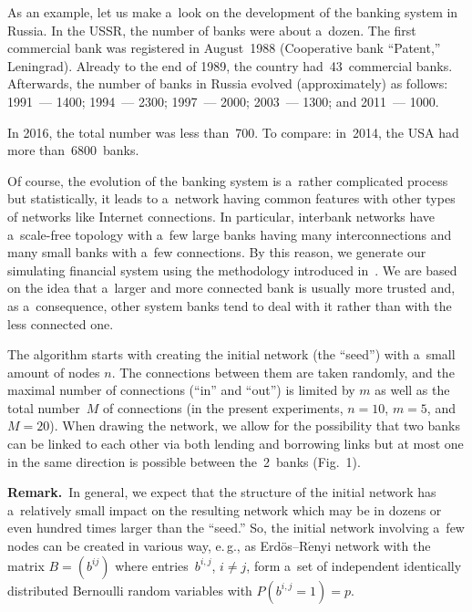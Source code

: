 \begin{multicols}{2}
As an example, let us make a~look on  the development of the banking system in 
Russia. In the USSR, the number of banks were about a~dozen. The first commercial 
bank was registered in August~1988 (Cooperative bank ``Patent,'' Leningrad).  
Already to the end of 1989, the country had~43~commercial banks.   Afterwards,  
the number of banks in Russia evolved (approximately) as follows:  
1991~--- 1400;  1994~--- 2300; 1997~--- 2000; 2003~--- 1300; and  2011~---
1000. 

In   2016, the total number was  less than~700.  To compare:  in~2014, the USA had  
more than~6800~banks.  

Of course, the evolution of the banking system is a~rather complicated process 
but  statistically, it leads to a~network having common features with other 
types of networks like Internet connections.  In particular, interbank networks 
have a~scale-free topology with a~few large banks having many interconnections 
and many small banks with a~few connections.
By this reason, we generate our simulating financial system using the 
methodology introduced in~\cite{BarAlb}. We are 
based on the idea that a~larger and more connected bank is usually more trusted 
and, as a~consequence, other system banks tend to deal with it rather than with 
the less connected  one.

The algorithm starts with creating the initial network (the ``seed'') with 
a~small amount of nodes $n$.  The connections between them are taken randomly, and 
the maximal number of connections (``in'' and ``out'')  is limited by $m$ as well 
as the total number~$M$ of connections (in the present experiments, $n=10$, $m=5$, 
and $M=20$). 
  When drawing the network, we allow for the possibility that two banks can be 
linked to each other via both lending and borrowing links but at most one   in 
the same direction is possible between the~2~banks (Fig.~1).

\smallskip  

\noindent
\textbf{Remark.}\ In general, we expect that the structure of the initial  network 
has a~relatively small impact 
on the resulting network which may be in dozens or even hundred times larger 
than the ``seed.'' 
So, the initial network  involving a~few nodes can be created in various way, 
e.\,g., as Erd\"os--R$\acute{\mbox{e}}$nyi network with the matrix 
$B=(b^{ij})$ where  entries~$b^{i,j}$, $i\neq j$, form a~set of independent
 identically distributed  Bernoulli random variables with $P(b^{i,j}=1)=p$.      


\end{multicols}
